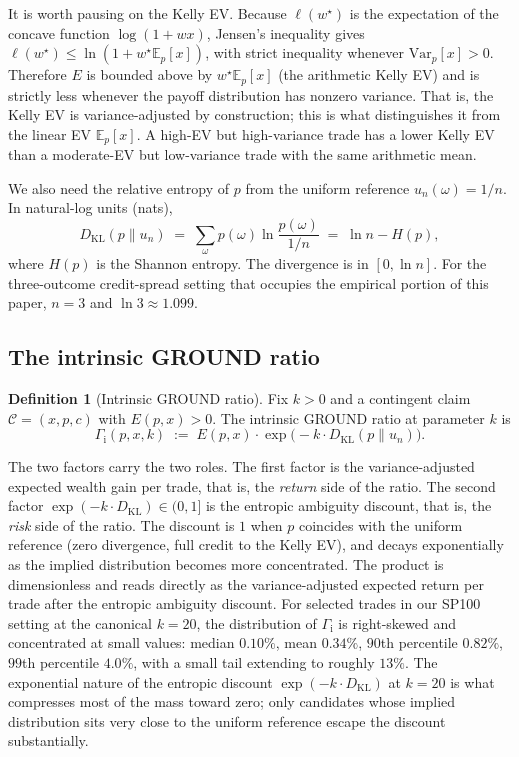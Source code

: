 \documentclass[11pt]{article}
\theoremstyle{definition}
\newtheorem{definition}[theorem]{Definition}
\theoremstyle{remark}
\newcommand{\E}{\mathbb{E}}
\newcommand{\C}{\mathcal{C}}
\newcommand{\KL}{D_{\mathrm{KL}}}
\newcommand{\GROUND}{\Gamma_{\mathrm{i}}}
\begin{document}
It is worth pausing on the Kelly EV. Because $\ell(w^\star)$ is the
expectation of the concave function $\log(1 + w x)$, Jensen's
inequality gives $\ell(w^\star) \le \ln(1 + w^\star \E_p[x])$, with
strict inequality whenever $\mathrm{Var}_p[x] > 0$. Therefore $E$ is
bounded above by $w^\star \E_p[x]$ (the arithmetic Kelly EV) and is
strictly less whenever the payoff distribution has nonzero variance.
That is, the Kelly EV is variance-adjusted by construction; this is
what distinguishes it from the linear EV $\E_p[x]$. A high-EV but
high-variance trade has a lower Kelly EV than a moderate-EV but
low-variance trade with the same arithmetic mean.

We also need the relative entropy of $p$ from the uniform reference
$u_n(\omega) = 1/n$. In natural-log units (nats),
\begin{equation}
\KL(p \| u_n) \;=\; \sum_{\omega} p(\omega) \ln\!\frac{p(\omega)}{1/n} \;=\; \ln n - H(p),
\label{eq:KL}
\end{equation}
where $H(p)$ is the Shannon entropy. The divergence is in $[0, \ln
n]$. For the three-outcome credit-spread setting that occupies the
empirical portion of this paper, $n = 3$ and $\ln 3 \approx 1.099$.

\subsection{The intrinsic GROUND ratio}

\begin{definition}[Intrinsic GROUND ratio]\label{def:ground}
Fix $k > 0$ and a contingent claim $\C = (x, p, c)$ with $E(p, x) >
0$. The intrinsic GROUND ratio at parameter $k$ is
\begin{equation}
\boxed{\;
\GROUND(p, x, k) \;:=\; E(p, x) \cdot \exp\!\bigl(-k \cdot \KL(p \| u_n)\bigr).
\;}
\label{eq:ground}
\end{equation}
\end{definition}

The two factors carry the two roles. The first factor is the
variance-adjusted expected wealth gain per trade, that is, the
\emph{return} side of the ratio. The second factor $\exp(-k \cdot
\KL) \in (0, 1]$ is the entropic ambiguity discount, that is, the
\emph{risk} side of the ratio. The discount is $1$ when $p$
coincides with the uniform reference (zero divergence, full credit
to the Kelly EV), and decays exponentially as the implied
distribution becomes more concentrated. The product is dimensionless
and reads directly as the variance-adjusted expected return per trade
after the entropic ambiguity discount. For selected trades in our SP100 setting at the canonical
$k = 20$, the distribution of $\GROUND$ is right-skewed and
concentrated at small values: median $0.10\%$, mean $0.34\%$,
$90$th percentile $0.82\%$, $99$th percentile $4.0\%$, with a
small tail extending to roughly $13\%$. The exponential nature of
the entropic discount $\exp(-k \cdot \KL)$ at $k = 20$ is what
compresses most of the mass toward zero; only candidates whose
implied distribution sits very close to the uniform reference
escape the discount substantially.
\end{document}
